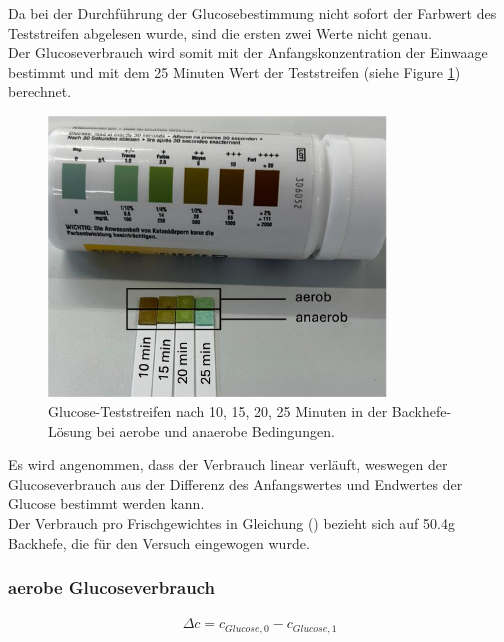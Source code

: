 \documentclass[10pt,a4paper]{article}
\begin{document}
			Da bei der Durchführung der Glucosebestimmung nicht sofort der Farbwert des Teststreifen abgelesen wurde, sind die ersten zwei Werte nicht genau.\\
			Der Glucoseverbrauch wird somit mit der Anfangskonzentration der Einwaage bestimmt und mit dem 25 Minuten Wert der Teststreifen (siehe Figure \ref{fig: Glucoseverbrauch}) berechnet.
		
			\begin{figure}[H]
				\centering
				\includegraphics[width=0.8\textwidth]{Teststreifen.png}
				\caption{Glucose-Teststreifen nach 10, 15, 20, 25 Minuten in der Backhefe-Lösung bei aerobe und anaerobe Bedingungen.}
				\label{fig: Glucoseverbrauch}
			\end{figure}
		
			Es wird angenommen, dass der Verbrauch linear verläuft, weswegen der Glucoseverbrauch aus der Differenz des Anfangswertes und Endwertes der Glucose bestimmt werden kann.\\
			Der Verbrauch pro Frischgewichtes in Gleichung () bezieht sich auf 50.4g Backhefe, die für den Versuch eingewogen wurde.
			
			\subsubsection{aerobe Glucoseverbrauch}
			\begin{equation}\label{fig:VERBRAUCH_Glucose}
				\begin{split}
				\Delta c = c_{Glucose, 0} - c_{Glucose , 1}\\
				\end{split}
			\end{equation}
		
\end{document}
